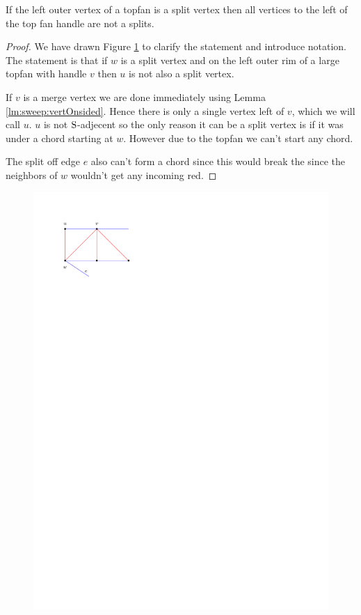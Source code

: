     \begin{lemma}
      \label{lm:sweep:NoTwoSplitsAboveEachOther}
      If the left outer vertex of a topfan is a split vertex then all vertices to the left of the top fan handle are not a splits.
    \end{lemma}

    \begin{proof}
      We have drawn Figure \ref{fig:sweep:splitsAboveEachOther} to clarify the statement and introduce notation. The statement is that if $w$ is a split vertex and on the left outer rim of a large topfan with handle $v$ then $u$ is not also a split vertex.

      If $v$ is a merge vertex we are done immediately using Lemma \ref{lm:sweep:vertOnsided}. Hence there is only a single vertex left of $v$, which we will call $u$. $u$ is not $\mathrm{S}$-adjecent so the only reason it can be a split vertex is if it was under a chord starting at $w$. However due to the topfan we can't start any chord.

      The split off edge $e$ also can't form a chord since this would break the \rel since the neighbors of $w$ wouldn't get any incoming red.
    \end{proof}


    \begin{figure}[h]
      \centering
      \includegraphics[scale=1]{unifiedAlgo/img/splitsAboveEachOther.pdf}
      \caption{}
      \label{fig:sweep:splitsAboveEachOther}
    \end{figure}
